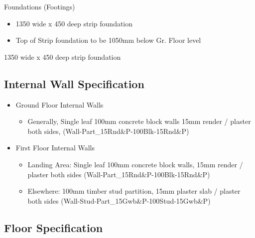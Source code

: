 Foundations (Footings)

\begin{itemize}
	\item 1350 wide x 450 deep strip foundation
	\item Top of Strip foundation to be 1050mm below Gr. Floor level
\end{itemize}
1350 wide x 450 deep strip foundation


\subsection*{Internal Wall Specification}

\begin{itemize}
	\item Ground Floor Internal Walls
		\begin{itemize}
			\item Generally, Single leaf 100mm concrete block walls 15mm render / plaster both sides, (Wall-Part\_15Rnd\&P-100Blk-15Rnd\&P)
		\end{itemize}
	\item First Floor Internal Walls
		\begin{itemize}
			\item Landing Area: Single leaf 100mm concrete block walls, 15mm render / plaster both sides (Wall-Part\_15Rnd\&P-100Blk-15Rnd\&P)
			\item Elsewhere: 100mm timber stud partition, 15mm plaster slab / plaster both sides (Wall-Stud-Part\_15Gwb\&P-100Stud-15Gwb\&P) 
		\end{itemize} 
\end{itemize}



\subsection*{Floor Specification}



